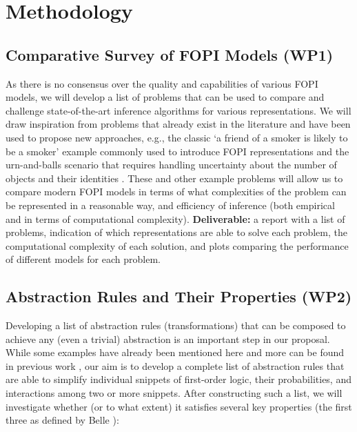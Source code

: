 \documentclass{article}
\begin{document}
\section{Methodology}

\subsection{Comparative Survey of FOPI Models (WP1)}

As there is no consensus over the quality and capabilities of various
FOPI models, we will develop a list of problems that can be used to compare and
challenge state-of-the-art inference algorithms for various representations. We
will draw inspiration from problems that already exist in the literature and
have been used to propose new approaches, e.g., the classic `a friend of a
smoker is likely to be a smoker' example commonly used to introduce FOPI
representations
\cite{DBLP:series/sci/BrazAR08,DBLP:conf/ijcai/BroeckTMDR11,DBLP:journals/ml/RichardsonD06,DBLP:journals/cib/Venugopal17}
and the urn-and-balls scenario that requires handling uncertainty about the
number of objects and their identities \cite{DBLP:conf/ijcai/MilchMRSOK05}.
These and other example problems will allow us to compare modern FOPI models
in terms of what complexities of the problem can be represented in a reasonable
way, and efficiency of inference (both empirical and in terms of computational
complexity). \textbf{Deliverable:} a report with a list of problems, indication of
which representations are able to solve each problem, the computational
complexity of each solution, and plots comparing the performance of different
models for each problem.

\subsection{Abstraction Rules and Their Properties (WP2)}

Developing a list of abstraction rules (transformations) that can be composed to
achieve any (even a trivial) abstraction is an important step in our proposal.
While some examples have already been mentioned here and more can be found in
previous work
\cite{DBLP:journals/corr/abs-1810-02434,DBLP:journals/ai/GiunchigliaW92,DBLP:conf/uai/HoltzenMB17,saitta2013abstraction},
our aim is to develop a complete list of abstraction rules that are able to
simplify individual snippets of first-order logic, their probabilities, and
interactions among two or more snippets. After constructing such a list, we will
investigate whether (or to what extent) it satisfies several key properties (the
first three as defined by Belle \cite{DBLP:journals/corr/abs-1810-02434}):
\end{document}
